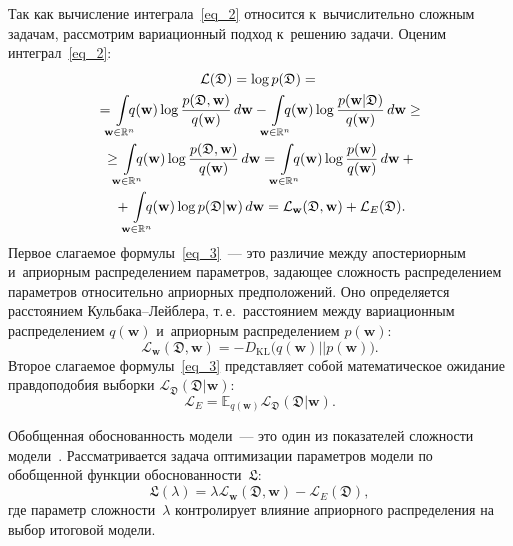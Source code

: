 \begin{multicols}{2}
Так как вычисление интеграла~\eqref{eq_2} относится к~вычислительно сложным 
задачам, рассмотрим вариационный подход к~решению задачи. Оценим 
интеграл~\eqref{eq_2}:
\begin{multline}
\mathcal{L}(\mathfrak{D}) = \log p(\mathfrak{D}) = {}\\
{}=\!\!\!\int\limits_{\mathbf{w}\in 
\mathbb{R}^n}\!\!\!\!\! q(\mathbf{w}) \log \fr{p(\mathfrak{D}, 
\mathbf{w})}{q(\mathbf{w})}\,d\mathbf{w} - \!\!\!\int\limits_{\mathbf{w}\in 
\mathbb{R}^n}\!\!\!\!\! q(\mathbf{w}) \log 
\fr{p(\mathbf{w}|\mathfrak{D})}{q(\mathbf{w})}\,d\mathbf{w} \geq {}\hspace*{-0.4247pt}\\
{} \geq \!\!\!\int\limits_{\mathbf{w}\in \mathbb{R}^n} \!\!\!\!\!q(\mathbf{w}) \log 
\fr{p(\mathfrak{D}, \mathbf{w})}{q(\mathbf{w})}\,d\mathbf{w} = 
\!\!\!\int\limits_{\mathbf{w}\in \mathbb{R}^n} \!\!\!\!\!q(\mathbf{w}) \log 
\fr{p(\mathbf{w})}{q(\mathbf{w})}\,d\mathbf{w} +{}\\
{}+\!\!\! \int\limits_{\mathbf{w}\in 
\mathbb{R}^n} \!\!\!\!\!q(\mathbf{w}) \log p(\mathfrak{D}|\mathbf{w})\,d\mathbf{w} =
 \mathcal{L}_{\mathbf{w}}(\mathfrak{D}, \mathbf{w}) + \mathcal{L}_E 
(\mathfrak{D}).
\label{eq_3}
\end{multline}
Первое слагаемое формулы~\eqref{eq_3}~--- это различие между апостериорным 
и~априорным распределением параметров, задающее сложность распределением 
параметров относительно априорных предположений.
Оно определяется расстоянием Куль\-ба\-ка--Лейб\-ле\-ра, т.\,е.\ расстоянием между 
вариационным распределением $q(\mathbf{w})$ и~априорным распределением 
$p(\mathbf{w})$:
$$
\mathcal{L}_{\mathbf{w}} (\mathfrak{D}, \mathbf{w}) = - D_{\mathrm{KL}} \bigl( 
q(\mathbf{w})||p(\mathbf{w})\bigr).
$$
Второе слагаемое формулы~\eqref{eq_3} представляет собой математическое ожидание 
правдоподобия выборки $\mathcal{L}_{\mathfrak{D}}(\mathfrak{D}|\mathbf{w})$:
$$
\mathcal{L}_{E} = 
\mathbb{E}_{q(\mathbf{w})}\mathcal{L}_{\mathfrak{D}}(\mathfrak{D}|\mathbf{w}).
$$

Обобщенная обоснованность модели~--- это один из показателей сложности 
модели~\cite{conf/nips/Graves11}.
Рас\-смат\-ри\-ва\-ет\-ся задача оптимизации параметров модели по обобщенной функции 
обоснованности~$\mathfrak{L}$:
\begin{equation}
\label{obosn}
\mathfrak{L}(\lambda) = \lambda\mathcal{L}_{\mathbf{w}}(\mathfrak{D}, 
\mathbf{w}) - \mathcal{L}_E (\mathfrak{D}),
\end{equation}
где параметр слож\-ности~$\lambda$ контролирует влияние априорного распределения 
на выбор итоговой модели.


\end{multicols}
